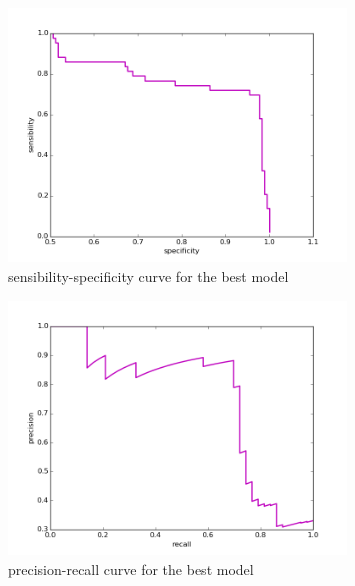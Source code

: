 \begin{figure}[h]
	\centering
	\includegraphics[width= 0.8\textwidth]{chapter4/sensibility_specificity.png}
	\caption{sensibility-specificity curve for the best model}
	\label{fig:sensibility_specificity_best}
\end{figure}

\begin{figure}[h]
	\centering
	\includegraphics[width= 0.8\textwidth]{chapter4/precision_recall.png}
	\caption{precision-recall curve for the best model}
	\label{fig:precision_recall_best}
\end{figure}